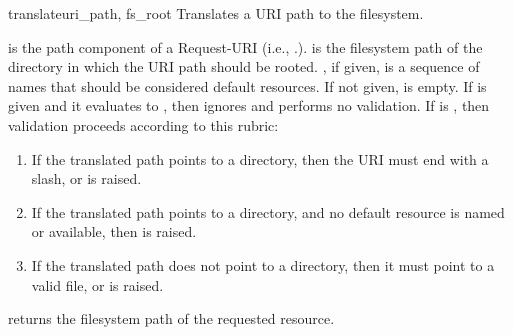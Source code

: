 \begin{funcdesc}{translate}{uri_path, fs_root}
Translates a URI path to the filesystem.

 is the path component of a Request-URI (i.e.,
.).  is the filesystem path of the
directory in which the URI path should be rooted. , if given, is a
sequence of names that should be considered default resources. If not given,
 is empty. If  is given and it evaluates to ,
then  ignores  and performs no validation. If
 is , then validation proceeds according to this rubric:

\begin{enumerate}

\item If the translated path points to a directory, then the URI must end with a
slash, or 
is raised.

\item If the translated path points to a directory, and no default resource is
named or available, then  is
raised.

\item If the translated path does not point to a directory, then it must point
to a valid file, or  is
raised.

\end{enumerate}

 returns the filesystem path of the requested resource.
\end{funcdesc}
